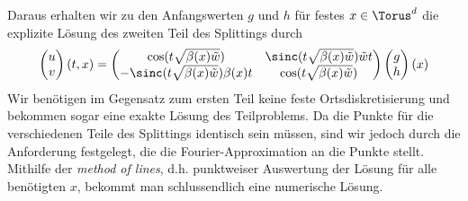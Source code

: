 Daraus erhalten wir zu den Anfangswerten $g$ und $h$ für festes $x\in \Torus^d$ die explizite Lösung des zweiten Teil des Splittings durch
\[\begin{pmatrix}u\\v\end{pmatrix}(t,x)=
\begin{pmatrix}\cos(t\sqrt{\beta(x)\tilde{w}}) & \sinc(t\sqrt{\beta(x)\tilde{w}})\tilde{w}t\\
-\sinc(t\sqrt{\beta(x)\tilde{w}})\beta(x)t & \cos(t\sqrt{\beta(x)\tilde{w}})\end{pmatrix}
\begin{pmatrix}g\\h\end{pmatrix}(x)\]
Wir benötigen im Gegensatz zum ersten Teil keine feste Ortsdiskretisierung und bekommen sogar eine exakte Lösung des Teilproblems. Da die Punkte für die verschiedenen Teile des Splittings identisch sein müssen, sind wir jedoch durch die Anforderung festgelegt, die die Fourier-Approximation an die Punkte stellt.\\
Mithilfe der \emph{method of lines}, d.h. punktweiser Auswertung der Lösung für alle benötigten $x$, bekommt man schlussendlich eine numerische Lösung.

